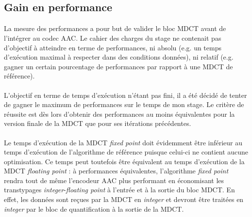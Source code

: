 \documentclass{article}
\begin{document}





    \subsection{Gain en performance}
    \label{sec:mdct_perfs}
    \paragraph{}
    La mesure des performances a pour but de valider le bloc MDCT avant de l'intégrer au codec AAC. Le cahier des charges du stage ne contenait pas d'objectif à atteindre en terme de performances, ni absolu (e.g. un temps d'exécution maximal à respecter dans des conditions données), ni relatif (e.g. gagner un certain pourcentage de performances par rapport à une MDCT de référence).

    \paragraph{}
    L'objectif en terme de temps d'exécution n'étant pas fini, il a été décidé de tenter de gagner le maximum de performances sur le temps de mon stage. Le critère de réussite est dès lors d'obtenir des performances au moins équivalentes pour la version finale de la MDCT que pour ses itérations précédentes.

    \paragraph{}
    Le temps d'exécution de la MDCT \emph{fixed point} doit évidemment être inférieur au temps d'exécution de l'algorithme de référence puisque celui-ci ne contient aucune optimisation. Ce temps peut toutefois être équivalent au temps d'exécution de la MDCT \emph{floating point} : à performances équivalentes, l'algorithme \emph{fixed point} rendra tout de même l'encodeur AAC plus performant en économisant les transtypages \emph{integer}-\emph{floating point} à l'entrée et à la sortie du bloc MDCT. En effet, les données sont reçues par la MDCT en \emph{integer} et devront être traitées en \emph{integer} par le bloc de quantification à la sortie de la MDCT.
\end{document}
